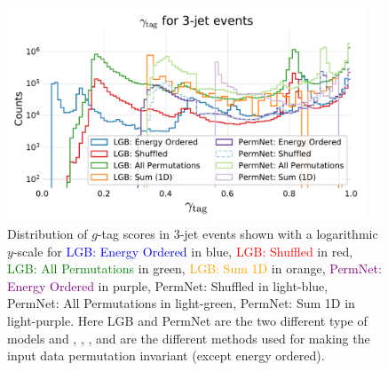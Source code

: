 \begin{figure}
    \includegraphics[width=0.95\textwidth, trim=10 10 10 45, clip]{figures/quarks/gtag_y_pred_3_jet_hist-down_sample=1.00-ML_vars=vertex-selection=b-ejet_min=4-n_iter_RS_lgb=99-n_iter_RS_xgb=9-cdot_cut=0.90-version=19.pdf}
    \caption[$g$-Tag Scores in 3-Jet Events]
            {Distribution of $g$-tag scores in 3-jet events shown with a logarithmic $y$-scale for \textcolor{blue}{LGB: Energy Ordered} in blue, \textcolor{red}{LGB: Shuffled} in red, \textcolor{green}{LGB: All Permutations} in green, \textcolor{orange}{LGB: Sum 1D} in orange, \textcolor{purple}{PermNet: Energy Ordered} in purple, \textcolor{light-blue}{PermNet: Shuffled} in light-blue, \textcolor{light-green}{PermNet: All Permutations} in light-green, \textcolor{light-purple}{PermNet: Sum 1D} in light-purple.  Here LGB and PermNet are the two different type of models and , , , and  are the different methods used for making the input data permutation invariant (except energy ordered).}   
    \label{fig:q:gtag_scores_3j}
  \end{figure}


  \newpage

